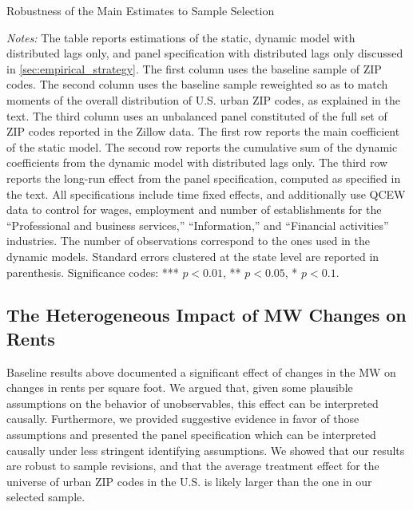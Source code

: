 \begin{table}[h!]\centering
	\caption{Robustness of the Main Estimates to Sample Selection}  %
	\label{tab:wgt_unbal_comparison}
	
	\begin{minipage}{0.95\textwidth}\footnotesize
	\vspace{3mm}	
	\textit{Notes:} The table reports estimations of the static, dynamic model with distributed
	lags only, and panel specification with distributed lags only discussed in 
	\autoref{sec:empirical_strategy}. The first column uses the baseline sample of ZIP codes. The 
	second column uses the baseline sample reweighted so as to match moments of the overall 
	distribution of U.S. urban ZIP codes, as explained in the text. The third column uses an 
	unbalanced 	panel constituted of the full set of ZIP codes reported in the Zillow data. The 
	first row reports the main coefficient of the static model. The second row reports the 
	cumulative sum of the dynamic coefficients from the dynamic model with distributed lags only. 
	The third row reports the long-run effect from the panel specification, computed as specified 
	in the text. All specifications include time fixed effects, and additionally use QCEW data to 
	control for wages, employment and number of establishments for the ``Professional and business 
	services,'' ``Information,'' and ``Financial activities'' industries. The number of observations 
	correspond to the ones used in the dynamic models. 
	Standard errors clustered at the state level are reported in parenthesis. Significance codes: 
	*** $p < 0.01$, ** $p < 0.05$, * $p < 0.1$.
	\end{minipage}
\end{table}



\subsection{The Heterogeneous Impact of MW Changes on Rents}\label{sec:heter}

Baseline results above documented a significant effect of changes in the MW on changes in rents 
per square foot. We argued that, given some plausible assumptions on the behavior of 
unobservables, this effect can be interpreted causally. Furthermore, we provided suggestive 
evidence in favor of those assumptions and presented the panel specification which can be 
interpreted causally under less stringent identifying assumptions. We showed that our results 
are robust to sample revisions, and that the average treatment effect for the universe of urban 
ZIP codes in the U.S. is likely larger than the one in our selected sample. 

